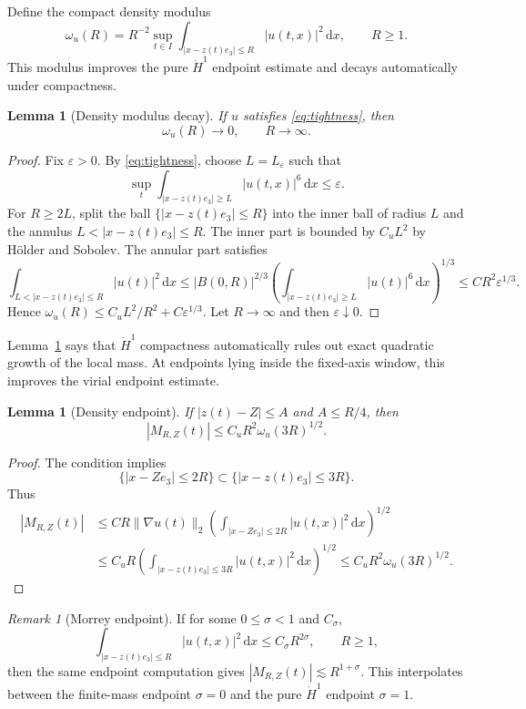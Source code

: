 \documentclass[preprint,12pt]{elsarticle}
\numberwithin{equation}{section}
\newcommand{\dd}{\,\mathrm d}
\newcommand{\eps}{\varepsilon}
\newcommand{\na}{\nabla}
\newcommand{\ez}{e_3}
\newtheorem{lemma}[theorem]{Lemma}
\theoremstyle{remark}
\newtheorem{remark}[theorem]{Remark}
\begin{document}
Define the compact density modulus
\[
  \omega_u(R)=R^{-2}\sup_{t\in I}\int_{|x-z(t)\ez|\le R}|u(t,x)|^2\dd x,
  \qquad R\ge1.
\]
This modulus improves the pure $\dot H^1$ endpoint estimate and decays automatically under compactness.

\begin{lemma}[Density modulus decay]\label{lem:omega-decay}
If $u$ satisfies \eqref{eq:tightness}, then
\[
  \omega_u(R)\to0,
  \qquad R\to\infty.
\]
\end{lemma}

\begin{proof}
Fix $\eps>0$.  By \eqref{eq:tightness}, choose $L=L_\eps$ such that
\[
  \sup_t\int_{|x-z(t)\ez|\ge L}|u(t,x)|^6\dd x\le\eps.
\]
For $R\ge2L$, split the ball $\{|x-z(t)\ez|\le R\}$ into the inner ball of radius $L$ and the annulus $L<|x-z(t)\ez|\le R$.  The inner part is bounded by $C_uL^2$ by H\"older and Sobolev.  The annular part satisfies
\[
  \int_{L<|x-z(t)\ez|\le R}|u(t)|^2\dd x
  \le |B(0,R)|^{2/3}
  \left(\int_{|x-z(t)\ez|\ge L}|u(t)|^6\dd x\right)^{1/3}
  \le CR^2\eps^{1/3}.
\]
Hence $\omega_u(R)\le C_uL^2/R^2+C\eps^{1/3}$.  Let $R\to\infty$ and then $\eps\downarrow0$.
\end{proof}

Lemma~\ref{lem:omega-decay} says that $\dot H^1$ compactness automatically rules out exact quadratic growth of the local mass.  At endpoints lying inside the fixed-axis window, this improves the virial endpoint estimate.

\begin{lemma}[Density endpoint]\label{lem:omega-endpoint}
If $|z(t)-Z|\le A$ and $A\le R/4$, then
\[
  |M_{R,Z}(t)|\le C_uR^2\omega_u(3R)^{1/2}.
\]
\end{lemma}

\begin{proof}
The condition implies
\[
  \{|x-Z\ez|\le2R\}\subset\{|x-z(t)\ez|\le3R\}.
\]
Thus
\begin{align*}
  |M_{R,Z}(t)|
  &\le C R\|\na u(t)\|_2
  \left(\int_{|x-Z\ez|\le2R}|u(t,x)|^2\dd x\right)^{1/2} \\
  &\le C_u R
  \left(\int_{|x-z(t)\ez|\le3R}|u(t,x)|^2\dd x\right)^{1/2}
  \le C_uR^2\omega_u(3R)^{1/2}.
\end{align*}
\end{proof}

\begin{remark}[Morrey endpoint]\label{rem:morrey}
If for some $0\le\sigma<1$ and $C_\sigma$,
\begin{equation}\label{eq:morrey-mass}
  \int_{|x-z(t)\ez|\le R}|u(t,x)|^2\dd x\le C_\sigma R^{2\sigma},
  \qquad R\ge1,
\end{equation}
then the same endpoint computation gives $|M_{R,Z}(t)|\lesssim R^{1+\sigma}$.  This interpolates between the finite-mass endpoint $\sigma=0$ and the pure $\dot H^1$ endpoint $\sigma=1$.
\end{remark}
\end{document}
